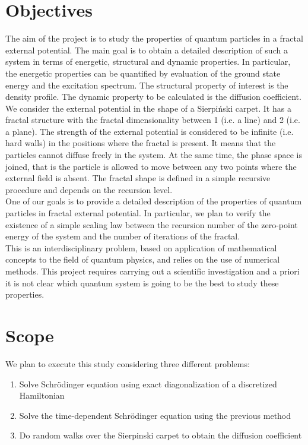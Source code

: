 \documentclass{article}
\begin{document}
\section{Objectives}
The aim of the project is to study the properties of quantum particles in a fractal external 
potential. The main goal is to obtain a detailed description of such a system in terms of 
energetic, structural and dynamic properties. In particular, the energetic properties can 
be quantified by evaluation of the ground state energy and the excitation spectrum. The 
structural property of interest is the density profile. The dynamic property to be calculated
is the diffusion coefficient.\\

We consider the external potential in the shape of a Sierpiński carpet. It has a fractal 
structure with the fractal dimensionality between 1 (i.e. a line) and 2 (i.e. a plane). 
The strength of the external potential is considered to be infinite (i.e. hard walls) in 
the positions where the fractal is present. It means that the particles cannot diffuse 
freely in the system. At the same time, the phase space is joined, that is the particle is 
allowed to move between any two points where the external field is absent. The fractal shape 
is defined in a simple recursive procedure and depends on the recursion level.\\

One of our goals is to provide a detailed description of the properties of quantum particles 
in fractal external potential. In particular, we plan to verify the existence of a simple 
scaling law between the recursion number of the zero-point energy of the system and the 
number of iterations of the fractal.\\

This is an interdisciplinary problem, based on application of mathematical concepts to the 
field of quantum physics, and relies on the use of numerical methods. This project requires 
carrying out a scientific investigation and a priori it is not clear which quantum system 
is going to be the best to study these properties.

\section{Scope}
We plan to execute this study considering three different problems:

\begin{enumerate}
    \item Solve Schrödinger equation using exact diagonalization of a discretized Hamiltonian
    \item Solve the time-dependent Schrödinger equation using the previous method
    \item Do random walks over the Sierpinski carpet to obtain the diffusion coefficient 
\end{enumerate}
\end{document}
